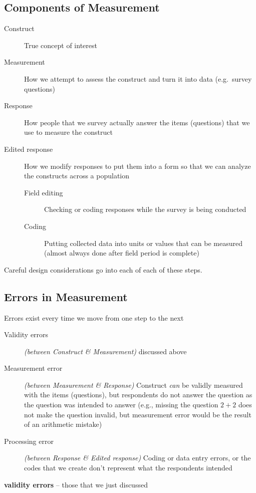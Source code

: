 \documentclass[11pt]{lecturenotes}
\begin{document}
\slide
\vspace{-2em}
\subsection[5]{Components of Measurement}
\begin{description}
\item[Construct] True concept of interest
\item[Measurement] How we attempt to assess the construct and turn it into data (e.g.\ survey questions)
\item[Response] How people that we survey actually answer the items (questions) that we use to measure the construct
\item[Edited response] How we modify responses to put them into a form so that we can analyze the constructs across a population
\begin{description}
\item[Field editing] Checking or coding responses while the survey is being conducted
\item[Coding] Putting collected data into units or values that can be measured (almost always done after field period is complete)
\end{description}
\end{description}
\vspace{-1em}
Careful design considerations go into each of each of these steps. 

\subsection[10]{Errors in Measurement}
\slide
Errors exist every time we move from one step to the next

\begin{description}
\item[Validity errors] \textit{(between Construct \& Measurement)} discussed above
\item[Measurement error] \textit{(between Measurement \& Response)} Construct \emph{can} be validly measured with the items (questions), but respondents do not answer the question as the question was intended to answer (e.g., missing the question $2+2$ does not make the question invalid, but measurement error would be the result of an arithmetic mistake)
\item[Processing error] \textit{(between Response \& Edited response)} Coding or data entry errors, or the codes that we create don't represent what the respondents intended
\end{description}
\textbf{validity errors} -- those that we just discussed
\end{document}
